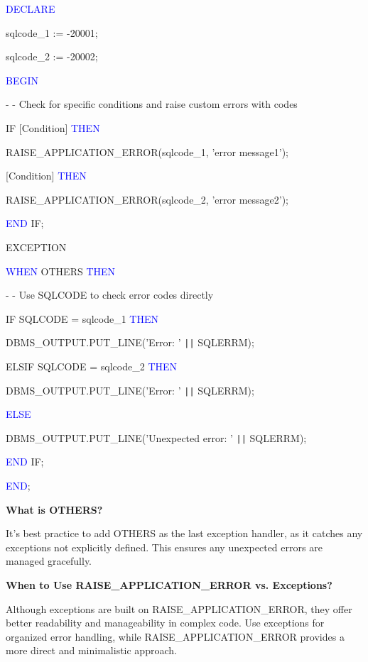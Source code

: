 \begin{tcolorbox}[title = Exceptions with SQLCODE]
    
    \textcolor{blue}{DECLARE}

     sqlcode\_1 := -20001;
    
     sqlcode\_2 := -20002;

     \textcolor{blue}{BEGIN}
    
     \textcolor{commentgray}{- - Check for specific conditions and raise custom errors with codes}
   
    IF [Condition] \textcolor{blue}{THEN}
    
    RAISE\_APPLICATION\_ERROR(sqlcode\_1, \textcolor{messagegreen}{'error message1'});
    
    [Condition] \textcolor{blue}{THEN}
    
    RAISE\_APPLICATION\_ERROR(sqlcode\_2, \textcolor{messagegreen}{'error message2'});
    
    \textcolor{blue}{END} IF;

EXCEPTION

\textcolor{blue}{WHEN} OTHERS \textcolor{blue}{THEN}

\textcolor{commentgray}{- - Use SQLCODE to check error codes directly}

IF SQLCODE = sqlcode\_1 \textcolor{blue}{THEN}

DBMS\_OUTPUT.PUT\_LINE(\textcolor{messagegreen}{'Error: '} \texttt{||} SQLERRM);

ELSIF SQLCODE = sqlcode\_2 \textcolor{blue}{THEN}

DBMS\_OUTPUT.PUT\_LINE(\textcolor{messagegreen}{'Error: '} \texttt{||} SQLERRM);

\textcolor{blue}{ELSE}

DBMS\_OUTPUT.PUT\_LINE(\textcolor{messagegreen}{'Unexpected error: '} \texttt{||} SQLERRM);

\textcolor{blue}{END} IF;

\textcolor{blue}{END};

\end{tcolorbox}
\begin{tcolorbox}[title = Note]
\textbf{What is OTHERS?}

It’s best practice to add OTHERS as the last exception handler, as it catches any exceptions not explicitly
defined. This ensures any unexpected errors are managed gracefully.

\textbf{When to Use RAISE\_APPLICATION\_ERROR vs. Exceptions?}

Although exceptions are built on RAISE\_APPLICATION\_ERROR, they offer better readability and manageability
in complex code. Use exceptions for organized error handling, while RAISE\_APPLICATION\_ERROR provides a more
direct and minimalistic approach.
\end{tcolorbox}


